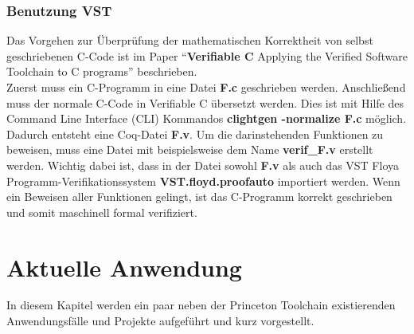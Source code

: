 \subsubsection{Benutzung VST}
Das Vorgehen zur Überprüfung der mathematischen Korrektheit von selbst geschriebenen C-Code ist im Paper "`\textbf{Verifiable C} Applying the Verified Software Toolchain to C programs"' beschrieben.\cite{Appel01:VST}\\
Zuerst muss ein C-Programm in eine Datei \textbf{F.c} geschrieben werden. Anschließend muss der normale C-Code in Verifiable C übersetzt werden. Dies ist mit Hilfe des Command Line Interface (CLI) Kommandos \textbf{clightgen -normalize F.c} möglich. Dadurch entsteht eine Coq-Datei \textbf{F.v}. Um die darinstehenden Funktionen zu beweisen, muss eine Datei mit beispielsweise dem Name \textbf{verif\_F.v} erstellt werden. Wichtig dabei ist, dass in der Datei sowohl \textbf{F.v} als auch das VST Floya Programm-Verifikationssystem \textbf{VST.floyd.proofauto} importiert werden. Wenn ein Beweisen aller Funktionen gelingt, ist das C-Programm korrekt geschrieben und somit maschinell formal verifiziert.


\section{Aktuelle Anwendung}
\label{s:current-usage}
In diesem Kapitel werden ein paar neben der Princeton Toolchain existierenden Anwendungsfälle und Projekte aufgeführt und kurz vorgestellt.

